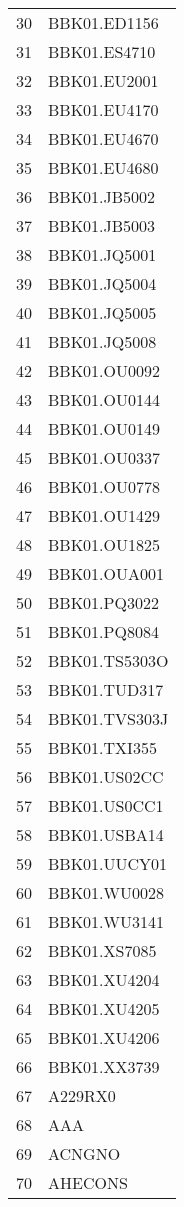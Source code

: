 \begin{table}[ht]
\begin{tabular}{rl}
  30 & BBK01.ED1156 \\ 
  31 & BBK01.ES4710 \\ 
  32 & BBK01.EU2001 \\ 
  33 & BBK01.EU4170 \\ 
  34 & BBK01.EU4670 \\ 
  35 & BBK01.EU4680 \\ 
  36 & BBK01.JB5002 \\ 
  37 & BBK01.JB5003 \\ 
  38 & BBK01.JQ5001 \\ 
  39 & BBK01.JQ5004 \\ 
  40 & BBK01.JQ5005 \\ 
  41 & BBK01.JQ5008 \\ 
  42 & BBK01.OU0092 \\ 
  43 & BBK01.OU0144 \\ 
  44 & BBK01.OU0149 \\ 
  45 & BBK01.OU0337 \\ 
  46 & BBK01.OU0778 \\ 
  47 & BBK01.OU1429 \\ 
  48 & BBK01.OU1825 \\ 
  49 & BBK01.OUA001 \\ 
  50 & BBK01.PQ3022 \\ 
  51 & BBK01.PQ8084 \\ 
  52 & BBK01.TS5303O \\ 
  53 & BBK01.TUD317 \\ 
  54 & BBK01.TVS303J \\ 
  55 & BBK01.TXI355 \\ 
  56 & BBK01.US02CC \\ 
  57 & BBK01.US0CC1 \\ 
  58 & BBK01.USBA14 \\ 
  59 & BBK01.UUCY01 \\ 
  60 & BBK01.WU0028 \\ 
  61 & BBK01.WU3141 \\ 
  62 & BBK01.XS7085 \\ 
  63 & BBK01.XU4204 \\ 
  64 & BBK01.XU4205 \\ 
  65 & BBK01.XU4206 \\ 
  66 & BBK01.XX3739 \\ 
  67 & A229RX0 \\ 
  68 & AAA \\ 
  69 & ACNGNO \\ 
  70 & AHECONS \\ 

\end{tabular}
\end{table}

